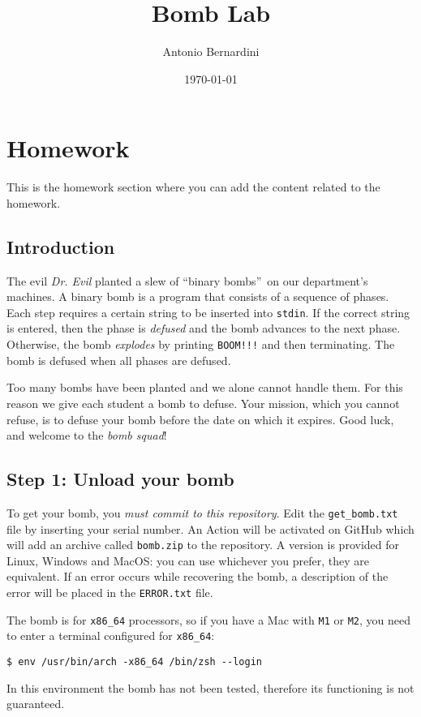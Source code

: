 \documentclass[a4paper,12pt]{report}  %
\title{Bomb Lab}            %
\author{Antonio Bernardini} %
\date{\today}               %
\newcommand{\lstinlinebg}[1]{\colorbox{backcolour}{\lstinline|#1|}}
\begin{document}
\maketitle  

\newpage  %

\tableofcontents

\newpage  %

\chapter{Homework}

This is the homework section where you can add the content related to the homework.

\section{Introduction}
The evil \textit{Dr. Evil} planted a slew of \textquotedblleft binary bombs\textquotedblright\ on our department's machines.
A binary bomb is a program that consists of a sequence of phases.
Each step requires a certain string to be inserted into \lstinlinebg{stdin}.
If the correct string is entered, then the phase is \textit{defused} and the bomb advances to the next phase.
Otherwise, the bomb \textit{explodes} by printing \lstinlinebg{BOOM!!!} and then terminating.
The bomb is defused when all phases are defused.

Too many bombs have been planted and we alone cannot handle them.
For this reason we give each student a bomb to defuse.
Your mission, which you cannot refuse, is to defuse your bomb before the date on which it expires.
Good luck, and welcome to the \textit{bomb squad}!

\section{Step 1: Unload your bomb}
To get your bomb, you \textit{must commit to this repository}.
Edit the \lstinlinebg{get_bomb.txt} file by inserting your serial number.
An Action will be activated on GitHub which will add an archive called \lstinlinebg{bomb.zip} to the repository.
A version is provided for Linux, Windows and MacOS: you can use whichever you prefer, they are equivalent.
If an error occurs while recovering the bomb, a description of the error will be placed in the \lstinlinebg{ERROR.txt} file.
\begin{tcolorbox}[
    colback=yellow!10,
    colframe=yellow!50!black,
    title={\textbf{WARNING}},
    fonttitle=\bfseries
]
The bomb is for \lstinlinebg{x86_64} processors, so if you have a Mac with \lstinlinebg{M1} or \lstinlinebg{M2}, you need to enter a terminal configured for \lstinlinebg{x86_64}:
\begin{lstlisting}[numbers=none]
$ env /usr/bin/arch -x86_64 /bin/zsh --login
\end{lstlisting}
In this environment the bomb has not been tested, therefore its functioning is not guaranteed.
\end{tcolorbox}
\end{document}
